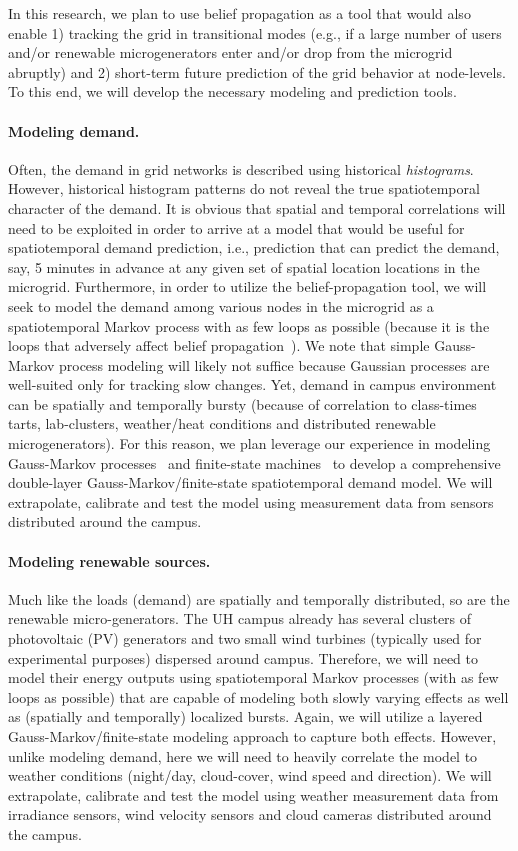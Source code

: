In this research, we plan to use belief propagation as a tool that would
also enable 1) tracking the grid in transitional modes (e.g., if a large
number of users and/or renewable microgenerators enter and/or drop from the
microgrid abruptly) and 2) short-term future prediction of the grid
behavior at node-levels.  To this end, we will develop the necessary
modeling and prediction tools.

\paragraph{Modeling demand.} Often, the demand in grid networks is
described using historical {\em histograms}. However, historical histogram
patterns do not reveal the true spatiotemporal character of the demand. It
is obvious that spatial and temporal correlations will need to be exploited
in order to arrive at a model that would be useful for spatiotemporal
demand prediction, i.e., prediction that can predict the demand, say, 5
minutes in advance at any given set of spatial location locations in the
microgrid.  Furthermore, in order to utilize the belief-propagation tool,
we will seek to model the demand among various nodes in the microgrid as a
spatiotemporal Markov process with as few loops as possible (because it is
the loops that adversely affect belief
propagation~\cite{Wiberg95,Kschischang01,Loeliger07}). We note that simple
Gauss-Markov process modeling will likely not suffice because Gaussian
processes are well-suited only for tracking slow changes.  Yet, demand in
campus environment can be spatially and temporally bursty (because of
correlation to class-times tarts, lab-clusters, weather/heat conditions and
distributed renewable microgenerators).  For this reason, we plan leverage
our experience in modeling Gauss-Markov processes~\cite{Kavcic00a} and
finite-state machines~\cite{Yang05,Vontobel08} to develop a comprehensive
double-layer Gauss-Markov/finite-state spatiotemporal demand model.  We
will extrapolate, calibrate and test the model using measurement data from
sensors distributed around the campus.

\paragraph{Modeling renewable sources.} Much like the loads (demand) are
spatially and temporally distributed, so are the renewable
micro-generators. The UH campus already has several clusters of
photovoltaic (PV) generators and two small wind turbines (typically used
for experimental purposes) dispersed around campus. Therefore, we will need
to model their energy outputs using spatiotemporal Markov processes (with
as few loops as possible) that are capable of modeling both slowly varying
effects as well as (spatially and temporally) localized bursts. Again, we
will utilize a layered Gauss-Markov/finite-state modeling approach to
capture both effects.  However, unlike modeling demand, here we will need
to heavily correlate the model to weather conditions (night/day,
cloud-cover, wind speed and direction). We will extrapolate, calibrate and
test the model using weather measurement data from irradiance sensors, wind
velocity sensors and cloud cameras distributed around the campus.



